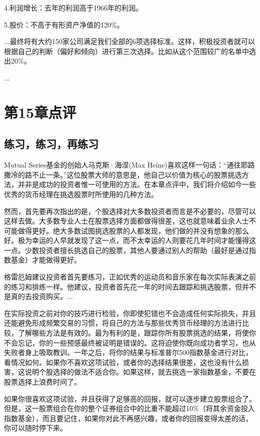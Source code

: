 \documentclass[12pt,oneside]{book}
\begin{document}
4.利润增长：去年的利润高于1966年的利润。

5.股价：不高于有形资产净值的120\%。

...最终将有大约150家公司满足我们全部的6项选择标准。这样，积极投资者就可以根据自己的判断（偏好和倾向）进行第三次选择。比如从这个范围较广的名单中选出20\%。

...



\section{第15章点评}
\subsection{练习，练习，再练习}
Mutual Series基金的创始人马克斯·海涅(Max Heine)喜欢这样一句话：“通往耶路撒冷的路不止一条。”这位股票大师的意思是，他自己以价值为核心的股票挑选方法，并非是成功的投资者惟一可使用的方法。在本章点评中，我们将介绍如今一些优秀的货币经理在挑选股票时所使用的几种方法。

然而，首先要再次指出的是，个股选择对大多数投资者而言是不必要的，尽管可以这样去做。大多数专业人士在股票选择方面都做得很差，这也就意味着业余人士不可能做得更好。绝大多数试图挑选股票的人都发现，他们做的并没有想象的那么好。极为幸运的人早就发现了这一点，而不太幸运的人则要花几年时间才能懂得这一点。少数投资者擅长挑选自己的股票，其他人要通过别人的帮助（最好是通过指数基金）才能做得更好。

格雷厄姆建议投资者首先要练习，正如优秀的运动员和音乐家在每次实际表演之前的练习和排练一样。他建议，投资者首先花一年的时间去跟踪和挑选股票，但并不是真的去投资购买。...

在实际投资之前对你的技巧进行检验，你即使犯错也不会造成任何实际损失，并且还能避免形成频繁交易的习惯，将自己的方法与那些优秀货币经理的方法进行比较，了解哪些方法是有效的。最为有利的是，跟踪你所有股票挑选的结果，将使你不会忘记，你的一些预感最终被证明是错误的。这将迫使你既向成功者学习，也从失败者身上吸取教训。一年之后，将你的结果与标准普尔500指数基金进行对比，看情况如何。如果你不喜欢这项试验，或者你的选择结果很差，这也没有什么损害，这说明个股选择的做法不适合你。如果这样，就去挑选一家指数基金，不要在股票选择上浪费时间了。

如果你很喜欢这项试验，并且获得了足够高的回报，就可以逐步建立股票组合了。但是，这一股票组合在你的整个证券组合中的比重不能超过10\%（将其余资金投入指数基金），而且要记住，如果你对此不再感兴趣，或者你的回报变得太差的话，你可以随时停下来。
\end{document}
